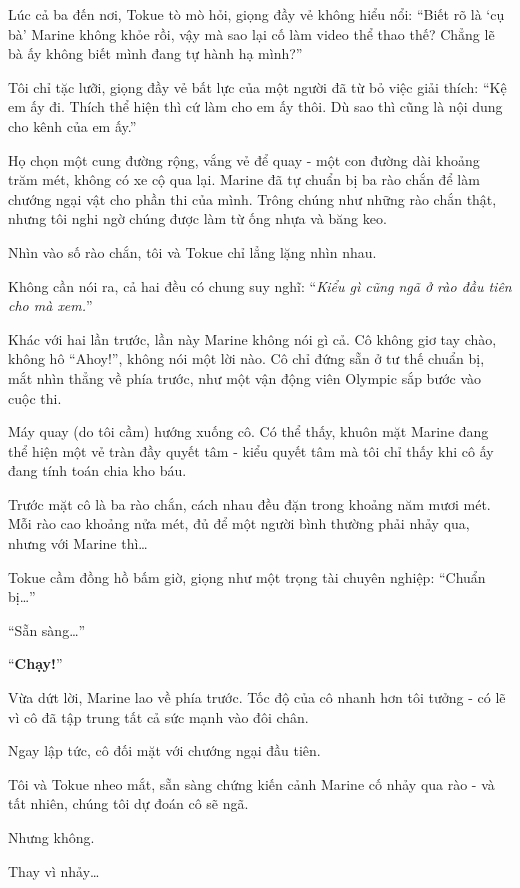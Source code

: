 \documentclass[../main.tex]{subfiles}
\begin{document}
Lúc cả ba đến nơi, Tokue tò mò hỏi, giọng đầy vẻ không hiểu nổi: ``Biết rõ là `cụ bà' Marine không khỏe rồi, vậy mà sao lại cố làm video thể thao thế? Chẳng lẽ bà ấy không biết mình đang tự hành hạ mình?''

Tôi chỉ tặc lưỡi, giọng đầy vẻ bất lực của một người đã từ bỏ việc giải thích: ``Kệ em ấy đi. Thích thể hiện thì cứ làm cho em ấy thôi. Dù sao thì cũng là nội dung cho kênh của em ấy.''

Họ chọn một cung đường rộng, vắng vẻ để quay - một con đường dài khoảng trăm mét, không có xe cộ qua lại. Marine đã tự chuẩn bị ba rào chắn để làm chướng ngại vật cho phần thi của mình. Trông chúng như những rào chắn thật, nhưng tôi nghi ngờ chúng được làm từ ống nhựa và băng keo.

Nhìn vào số rào chắn, tôi và Tokue chỉ lẳng lặng nhìn nhau.

Không cần nói ra, cả hai đều có chung suy nghĩ: ``\textit{Kiểu gì cũng ngã ở rào đầu tiên cho mà xem.}''

\il

Khác với hai lần trước, lần này Marine không nói gì cả. Cô không giơ tay chào, không hô ``Ahoy!'', không nói một lời nào. Cô chỉ đứng sẵn ở tư thế chuẩn bị, mắt nhìn thẳng về phía trước, như một vận động viên Olympic sắp bước vào cuộc thi.

Máy quay (do tôi cầm) hướng xuống cô. Có thể thấy, khuôn mặt Marine đang thể hiện một vẻ tràn đầy quyết tâm - kiểu quyết tâm mà tôi chỉ thấy khi cô ấy đang tính toán chia kho báu.

Trước mặt cô là ba rào chắn, cách nhau đều đặn trong khoảng năm mươi mét. Mỗi rào cao khoảng nửa mét, đủ để một người bình thường phải nhảy qua, nhưng với Marine thì\dots


Tokue cầm đồng hồ bấm giờ, giọng như một trọng tài chuyên nghiệp: ``Chuẩn bị\dots''

``Sẵn sàng\dots''

``\textbf{Chạy!}''

Vừa dứt lời, Marine lao về phía trước. Tốc độ của cô nhanh hơn tôi tưởng - có lẽ vì cô đã tập trung tất cả sức mạnh vào đôi chân.

Ngay lập tức, cô đối mặt với chướng ngại đầu tiên.

Tôi và Tokue nheo mắt, sẵn sàng chứng kiến cảnh Marine cố nhảy qua rào - và tất nhiên, chúng tôi dự đoán cô sẽ ngã.

Nhưng không.

Thay vì nhảy\dots
\end{document}
